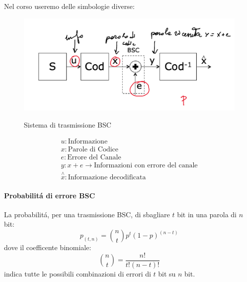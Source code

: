         Nel corso useremo delle simbologie diverse:
        \begin{figure}[H]
            \centering
            \includegraphics[width = 12cm]{media/BSC System.png}
            \label{BSC system moretti}
            \caption{Sistema di trasmissione BSC}
        \end{figure}
        \begin{gather}
            u: \text{Informazione} \nonumber \\
            x: \text{Parole di Codice} \nonumber \\
            e: \text{Errore del Canale} \nonumber \\
            y: x+e \rightarrow \text{Informazioni con errore del canale} \nonumber \\
            \overset{\wedge}{x}: \text{Informazione decodificata} \nonumber 
        \end{gather}
        \paragraph{Probabilitá di errore BSC}\label{Probabilita di errore BSC}
            La probabilitá, per una trasmissione BSC, di sbagliare $t$ bit in una parola di $n$ bit:
            \[
                p_{(t,n)} = \binom{n}{t} p^t (1-p)^{(n-t)}
            \]
            dove il coefficente binomiale:
            \[
                \binom{n}{t} = \frac{n!}{t!(n-t)!}
            \]
            indica tutte le possibili combinazioni di errori di $t$ bit su $n$ bit. 
